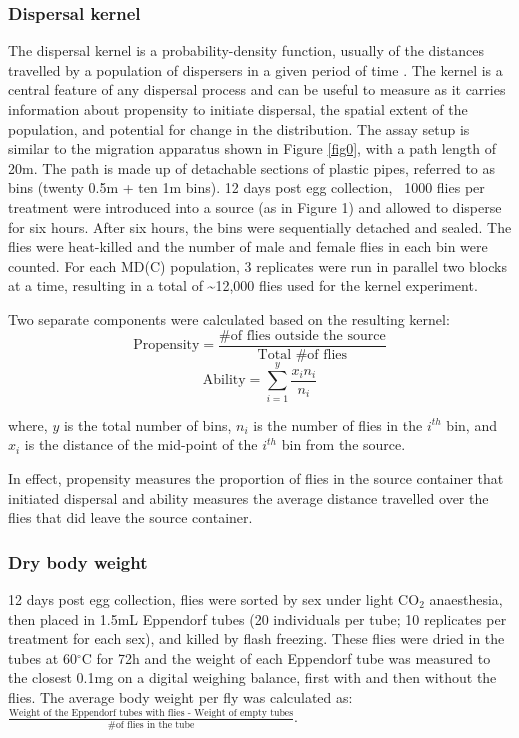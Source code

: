 \documentclass[12pt,onecolumn,twoside]{article}
\begin{document}
	\subsubsection{Dispersal kernel}
	The dispersal kernel is a probability-density function, usually of the distances travelled by a population of dispersers in a given period of time \citep{Clobert2012}. The kernel is a central feature of any dispersal process and can be useful to measure as it carries information about propensity to initiate dispersal, the spatial extent of the population, and potential for change in the distribution.
	The assay setup is similar to the migration apparatus shown in Figure \ref{fig0}, with a path length of 20m. The path is made up of detachable sections of plastic pipes, referred to as bins (twenty 0.5m + ten 1m bins). 12 days post egg collection, ~1000 flies per treatment were introduced into a source (as in Figure 1)  and allowed to disperse for six hours. After six hours, the bins were sequentially detached and sealed. The flies were heat-killed and the number of male and female flies in each bin were counted. For each MD(C) population, 3 replicates were run in parallel two blocks at a time, resulting in a total of \textasciitilde 12,000 flies used for the kernel experiment.

	Two separate components were calculated based on the resulting kernel:
	\[
		\text{Propensity} = \frac{\text{\# of flies outside the source}}{\text{Total \# of flies}}
	\]
	\[
		\text{Ability} = \sum_{i=1}^{y} \frac{x_{i}n_{i}}{n_{i}}
	\]

	where, $y$ is the total number of bins, $n_{i}$ is the number of flies in the $i^{th}$ bin, and $x_{i}$ is the distance of the mid-point of the $i^{th}$ bin from the source.

	In effect, propensity measures the proportion of flies in the source container that initiated dispersal and ability measures the average distance travelled over the flies that did leave the source container.

	\subsubsection{Dry body weight}
	12 days post egg collection, flies were sorted by sex under light CO$_\text{2}$ anaesthesia, then placed in 1.5mL Eppendorf tubes (20 individuals per tube; 10 replicates per treatment for each sex), and killed by flash freezing. These flies were dried in the tubes at 60$^{\circ}$C for 72h and the weight of each Eppendorf tube was measured to the closest 0.1mg on a digital weighing balance, first with and then without the flies. The average body weight per fly was calculated as: $\frac{\text{Weight of the Eppendorf tubes with flies - Weight of empty tubes}}{\text{\# of flies in the tube}}$.
\end{document}
